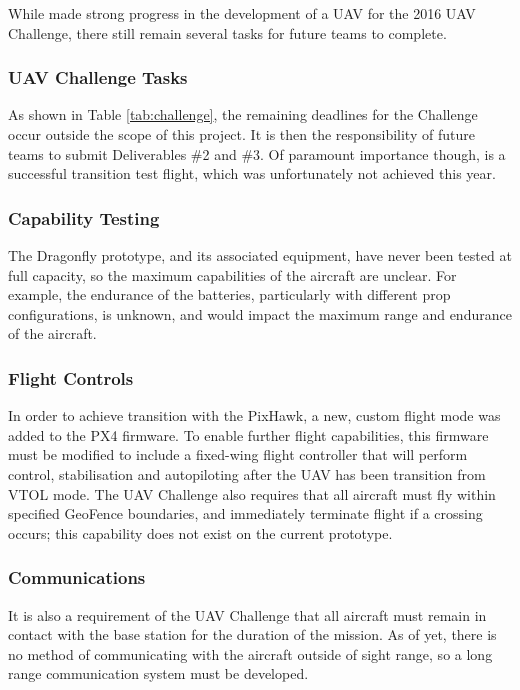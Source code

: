 \label{sec:futurework}
While \ID made strong progress in the development of a UAV for the 2016 UAV Challenge, there still remain several tasks for future teams to complete.

\subsubsection*{UAV Challenge Tasks}
As shown in Table \ref{tab:challenge}, the remaining deadlines for the Challenge occur outside the scope of this project. It is then the responsibility of future teams to submit Deliverables \#2 and \#3.  Of paramount importance though, is a successful transition test flight, which was unfortunately not achieved this year.

\subsubsection*{Capability Testing}
The Dragonfly prototype, and its associated equipment, have never been tested at full capacity, so the maximum capabilities of the aircraft are unclear. For example, the endurance of the batteries, particularly with different prop configurations, is unknown, and would impact the maximum range and endurance of the aircraft.

\subsubsection*{Flight Controls}
In order to achieve transition with the PixHawk, a new, custom flight mode was added to the PX4 firmware. To enable further flight capabilities, this firmware must be modified to include a fixed-wing flight controller that will perform control, stabilisation and autopiloting after the UAV has been transition from VTOL mode. The UAV Challenge also requires that all aircraft must fly within specified GeoFence boundaries, and immediately terminate flight if a crossing occurs; this capability does not exist on the current prototype.

\subsubsection*{Communications}
It is also a requirement of the UAV Challenge that all aircraft must remain in contact with the base station for the duration of the mission. As of yet, there is no method of communicating with the aircraft outside of sight range, so a long range communication system must be developed. 

